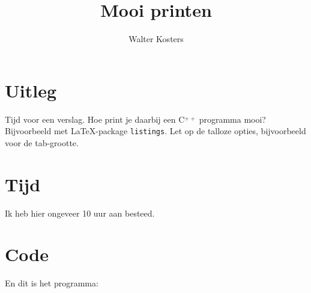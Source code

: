\documentclass[10pt]{article}
\title{Mooi printen}
\author{Walter Kosters}
\begin{document}

\maketitle

\section{Uitleg}
Tijd voor een verslag.
Hoe print je daarbij een C$\stackrel{++}{}$ programma mooi?
Bijvoorbeeld met \LaTeX-package \verb+listings+.
Let op de talloze opties, bijvoorbeeld voor de tab-grootte.

\section{Tijd}
Ik heb hier ongeveer 10 uur aan besteed.

\section*{Code}
En dit is het programma:










\end{document}
